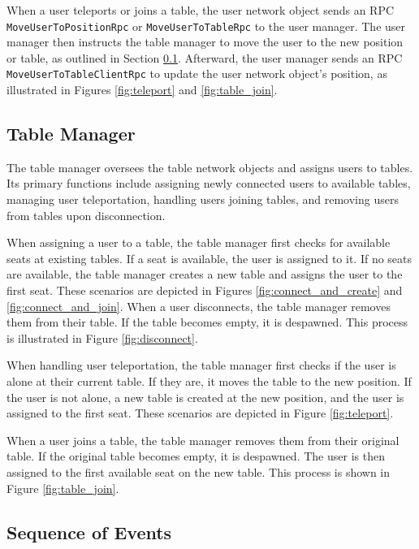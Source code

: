         When a user teleports or joins a table, the user network object sends an RPC \lstinline{MoveUserToPositionRpc} or \lstinline{MoveUserToTableRpc} to the user manager. The user manager then instructs the table manager to move the user to the new position or table, as outlined in Section \ref{sec:table_manager}. Afterward, the user manager sends an RPC \lstinline{MoveUserToTableClientRpc} to update the user network object's position, as illustrated in Figures \ref{fig:teleport} and \ref{fig:table_join}.

    \subsection{Table Manager} \label{sec:table_manager}

        The table manager oversees the table network objects and assigns users to tables. Its primary functions include assigning newly connected users to available tables, managing user teleportation, handling users joining tables, and removing users from tables upon disconnection.

        When assigning a user to a table, the table manager first checks for available seats at existing tables. If a seat is available, the user is assigned to it. If no seats are available, the table manager creates a new table and assigns the user to the first seat. These scenarios are depicted in Figures \ref{fig:connect_and_create} and \ref{fig:connect_and_join}. When a user disconnects, the table manager removes them from their table. If the table becomes empty, it is despawned. This process is illustrated in Figure \ref{fig:disconnect}.

        When handling user teleportation, the table manager first checks if the user is alone at their current table. If they are, it moves the table to the new position. If the user is not alone, a new table is created at the new position, and the user is assigned to the first seat. These scenarios are depicted in Figure \ref{fig:teleport}.

        When a user joins a table, the table manager removes them from their original table. If the original table becomes empty, it is despawned. The user is then assigned to the first available seat on the new table. This process is shown in Figure \ref{fig:table_join}.


    \subsection{Sequence of Events} \label{sec:sequence_events}

